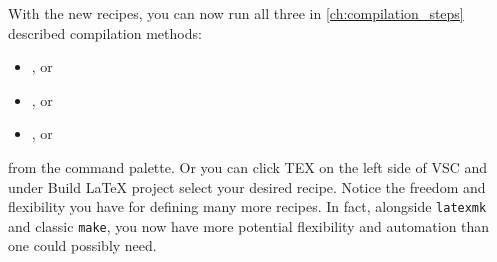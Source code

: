 With the new recipes, you can now run all three in \cref{ch:compilation_steps} described compilation methods:
\begin{itemize}
  \item {}, or
  \item {}, or
  \item {}, or
\end{itemize}
from the command palette. Or you can click TEX on the left side of VSC and under Build LaTeX project select your desired recipe.
Notice the freedom and flexibility you have for defining many more recipes.
In fact, alongside \texttt{latexmk} and classic \texttt{make}, you now have more potential flexibility and automation than one could possibly need.


